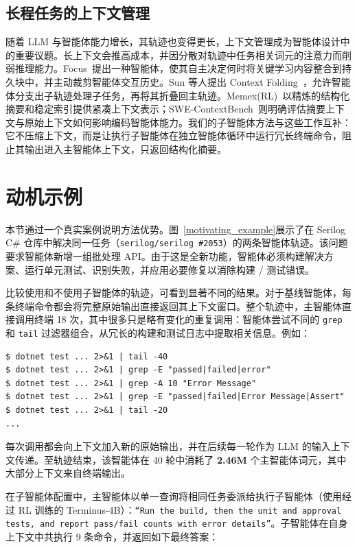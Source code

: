 \documentclass[sigconf,review]{acmart}
\begin{document}
\subsection{长程任务的上下文管理}
随着 LLM 与智能体能力增长，其轨迹也变得更长，上下文管理成为智能体设计中的重要议题。长上下文会推高成本，并因分散对轨迹中任务相关词元的注意力而削弱推理能力。Focus~\cite{focus}提出一种智能体，使其自主决定何时将关键学习内容整合到持久块中，并主动裁剪智能体交互历史。Sun 等人提出 Context Folding~\cite{contextfolding}，允许智能体分支出子轨迹处理子任务，再将其折叠回主轨迹。Memex(RL)~\cite{memex}以精炼的结构化摘要和稳定索引提供紧凑上下文表示；SWE-ContextBench~\cite{swecontextbench}则明确评估摘要上下文与原始上下文如何影响编码智能体能力。我们的子智能体方法与这些工作互补：它不压缩上下文，而是让执行子智能体在独立智能体循环中运行冗长终端命令，阻止其输出进入主智能体上下文，只返回结构化摘要。

\section{动机示例}
本节通过一个真实案例说明方法优势。图~\ref{motivating_example}展示了在 Serilog C\# 仓库中解决同一任务（\texttt{serilog/serilog \#2053}）的两条智能体轨迹。该问题要求智能体新增一组批处理 API。由于这是全新功能，智能体必须构建解决方案、运行单元测试、识别失败，并应用必要修复以消除构建 / 测试错误。

比较使用和不使用子智能体的轨迹，可看到显著不同的结果。对于基线智能体，每条终端命令都会将完整原始输出直接返回其上下文窗口。整个轨迹中，主智能体直接调用终端 18 次，其中很多只是略有变化的重复调用：智能体尝试不同的 \texttt{grep} 和 \texttt{tail} 过滤器组合，从冗长的构建和测试日志中提取相关信息。例如：

\begin{lstlisting}[basicstyle=\ttfamily\tiny]
$ dotnet test ... 2>&1 | tail -40
$ dotnet test ... 2>&1 | grep -E "passed|failed|error"
$ dotnet test ... 2>&1 | grep -A 10 "Error Message"
$ dotnet test ... 2>&1 | grep -E "passed|failed|Error Message|Assert"
$ dotnet test ... 2>&1 | tail -20
...
\end{lstlisting}

每次调用都会向上下文加入新的原始输出，并在后续每一轮作为 LLM 的输入上下文传递。至轨迹结束，该智能体在 40 轮中消耗了 \textbf{2.46M} 个主智能体词元，其中大部分上下文来自终端输出。

在子智能体配置中，主智能体以单一查询将相同任务委派给执行子智能体（使用经过 RL 训练的 Terminus-4B）：\texttt{“Run the build, then the unit and approval tests, and report pass/fail counts with error details”}。子智能体在自身上下文中共执行 9 条命令，并返回如下最终答案：
\end{document}
